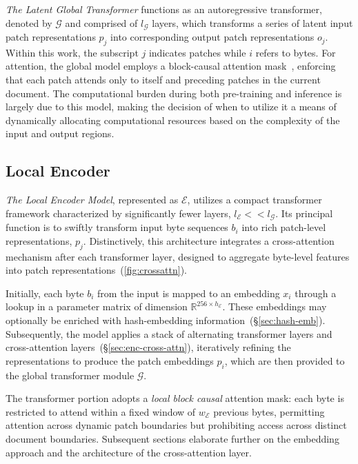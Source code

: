 \textit{The Latent Global Transformer} functions as an autoregressive transformer, denoted by $\mathcal{G}$ and comprised of $l_{\mathcal{G}}$ layers, which transforms a series of latent input patch representations $p_j$ into corresponding output patch representations $o_j$. Within this work, the subscript $j$ indicates patches while $i$ refers to bytes. For attention, the global model employs a block-causal attention mask~\citep{dubey2024llama}, enforcing that each patch attends only to itself and preceding patches in the current document. The computational burden during both pre-training and inference is largely due to this model, making the decision of when to utilize it a means of dynamically allocating computational resources based on the complexity of the input and output regions.

\subsection{Local Encoder}
\label{section:local}

\textit{The Local Encoder Model}, represented as $\mathcal{E}$, utilizes a compact transformer framework characterized by significantly fewer layers, $l_{\mathcal{E}} << l_{\mathcal{G}}$. Its principal function is to swiftly transform input byte sequences $b_i$ into rich patch-level representations, $p_j$. Distinctively, this architecture integrates a cross-attention mechanism after each transformer layer, designed to aggregate byte-level features into patch representations~(\autoref{fig:crossattn}).

Initially, each byte $b_i$ from the input is mapped to an embedding $x_i$ through a lookup in a parameter matrix of dimension $\mathbb{R}^{256 \times h_{\mathcal{E}}}$. These embeddings may optionally be enriched with hash-embedding information~(\S\ref{sec:hash-emb}). Subsequently, the model applies a stack of alternating transformer layers and cross-attention layers~(\S\ref{sec:enc-cross-attn}), iteratively refining the representations to produce the patch embeddings $p_i$, which are then provided to the global transformer module $\mathcal{G}$.

The transformer portion adopts a \textit{local block causal} attention mask: each byte is restricted to attend within a fixed window of $w_{\mathcal{E}}$ previous bytes, permitting attention across dynamic patch boundaries but prohibiting access across distinct document boundaries. Subsequent sections elaborate further on the embedding approach and the architecture of the cross-attention layer.

